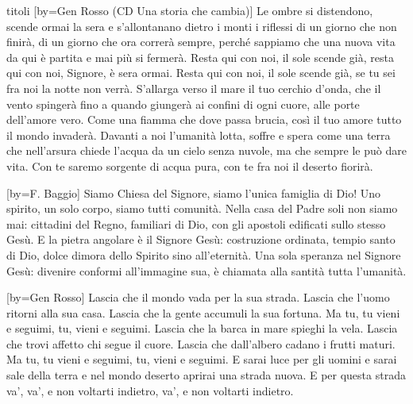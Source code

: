 \begin{songs}{titoli}
[by={Gen Rosso (CD Una storia che cambia)}]
\beginverse
Le ombre si distendono, scende ormai la sera
e s'allontanano dietro i monti
i riflessi di un giorno che non finirà,
di un giorno che ora correrà sempre,
perché sappiamo che una nuova vita
da qui è partita e mai più si fermerà.
\endverse
\beginchorus
Resta qui con noi, il sole scende già,
resta qui con noi, Signore, è sera ormai.
Resta qui con noi, il sole scende già,
se tu sei fra noi la notte non verrà.
\endchorus
\beginverse
S'allarga verso il mare il tuo cerchio d'onda,
che il vento spingerà fino a quando
giungerà ai confini di ogni cuore,
alle porte dell'amore vero.
Come una fiamma che dove passa brucia,
così il tuo amore tutto il mondo invaderà.
\endverse
\beginverse
Davanti a noi l'umanità lotta, soffre e spera
come una terra che nell'arsura
chiede l'acqua da un cielo senza nuvole,
ma che sempre le può dare vita.
Con te saremo sorgente di acqua pura,
con te fra noi il deserto fiorirà.
\endverse
\endsong

[by={F. Baggio}]
\beginchorus
Siamo Chiesa del Signore, siamo l'unica famiglia di Dio!
Uno spirito, un solo corpo, siamo tutti comunità.
\endchorus
\beginverse
Nella casa del Padre soli non siamo mai: cittadini del Regno, familiari di Dio,
con gli apostoli edificati sullo stesso Gesù.
\endverse
\beginverse
E la pietra angolare è il Signore Gesù: costruzione ordinata, tempio santo di Dio,
dolce dimora dello Spirito sino all'eternità.
\endverse
\beginverse
Una sola speranza nel Signore Gesù: divenire conformi all'immagine sua,
è chiamata alla santità tutta l'umanità.
\endverse
\endsong

[by={Gen Rosso}]
\beginverse
Lascia che il mondo vada per la sua strada.
Lascia che l'uomo ritorni alla sua casa.
Lascia che la gente accumuli la sua fortuna.
Ma tu, tu vieni e seguimi, tu, vieni e seguimi.
\endverse
\beginverse
Lascia che la barca in mare spieghi la vela.
Lascia che trovi affetto chi segue il cuore.
Lascia che dall'albero cadano i frutti maturi.
Ma tu, tu vieni e seguimi, tu, vieni e seguimi.
\endverse
\beginchorus
E sarai luce per gli uomini
e sarai sale della terra
e nel mondo deserto aprirai
una strada nuova. 
\endchorus
\beginverse*
E per questa strada va', va',
e non voltarti indietro, va',
e non voltarti indietro.
\endverse
\endsong


\end{songs}
